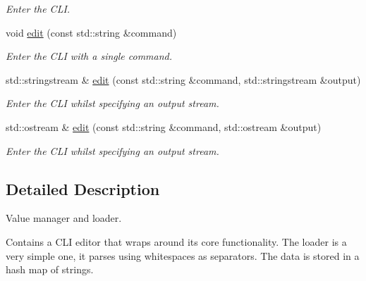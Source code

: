 \begin{DoxyCompactItemize}
\begin{DoxyCompactList}\small\item\em Enter the C\-L\-I. \end{DoxyCompactList}\item 
\hypertarget{classttl_1_1_valman_aee9df8369fcad995d061b1928d1591d4}{void \hyperlink{classttl_1_1_valman_aee9df8369fcad995d061b1928d1591d4}{edit} (const std\-::string \&command)}\label{classttl_1_1_valman_aee9df8369fcad995d061b1928d1591d4}

\begin{DoxyCompactList}\small\item\em Enter the C\-L\-I with a single command. \end{DoxyCompactList}\item 
\hypertarget{classttl_1_1_valman_aaef50349af0a4f80c7c47785e2e4bc5f}{std\-::stringstream \& \hyperlink{classttl_1_1_valman_aaef50349af0a4f80c7c47785e2e4bc5f}{edit} (const std\-::string \&command, std\-::stringstream \&output)}\label{classttl_1_1_valman_aaef50349af0a4f80c7c47785e2e4bc5f}

\begin{DoxyCompactList}\small\item\em Enter the C\-L\-I whilst specifying an output stream. \end{DoxyCompactList}\item 
\hypertarget{classttl_1_1_valman_ae64b9d9140407189d74dcb9eada6c5b6}{std\-::ostream \& \hyperlink{classttl_1_1_valman_ae64b9d9140407189d74dcb9eada6c5b6}{edit} (const std\-::string \&command, std\-::ostream \&output)}\label{classttl_1_1_valman_ae64b9d9140407189d74dcb9eada6c5b6}

\begin{DoxyCompactList}\small\item\em Enter the C\-L\-I whilst specifying an output stream. \end{DoxyCompactList}\end{DoxyCompactItemize}


\subsection{Detailed Description}
Value manager and loader. 

Contains a C\-L\-I editor that wraps around its core functionality. The loader is a very simple one, it parses using whitespaces as separators. The data is stored in a hash map of strings. 

